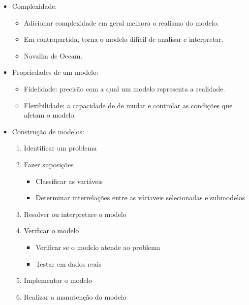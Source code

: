 \documentclass[]{beamer}
\begin{document}
\begin{frame}{\insertsection}{\insertsubsection}
\begin{itemize}
 \item Complexidade:
 \begin{itemize}
  \item Adicionar complexidade em geral melhora o realismo do modelo.
  \item Em contrapartida, torna o modelo difícil de analisar e interpretar.
  \item Navalha de Occam. %
 \end{itemize}
\end{itemize}
\begin{itemize}
 \item Propriedades de um modelo:
 \begin{itemize}
  \item Fidelidade: precisão com a qual um modelo representa a realidade.
  \item Flexibilidade: a capacidade de de mudar e controlar as condições que afetam o modelo.
 \end{itemize}
\end{itemize}
\end{frame}
\begin{frame}{\insertsection}{\insertsubsection}
\begin{itemize}
 \item Construção de modelos:
 \begin{enumerate}
  \item Identificar um problema
  \item Fazer suposições
  \begin{itemize}
   \item Classificar as variáveis
   \item Determinar interrelações entre as váriaveis selecionadas e submodelos
  \end{itemize}
  \item Resolver ou interpretare o modelo
  \item Verificar o modelo
  \begin{itemize}
    \item Verificar se o modelo atende ao problema
    \item Testar em dados reais
  \end{itemize}
  \item Implementar o modelo
  \item Realizar a manutenção do modelo
 \end{enumerate}

\end{itemize}

\end{frame}
\end{document}
